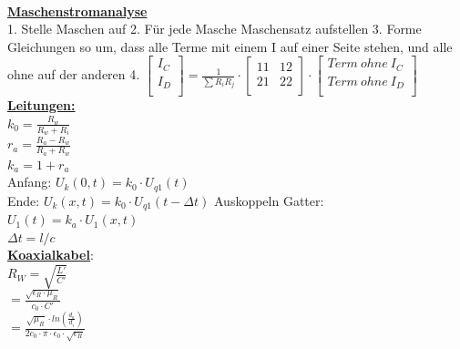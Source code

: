 \documentclass[11pt]{article}
\begin{document}
~~~~~~~
\begin{minipage}{0.3\textwidth}

\underline{\textbf{Maschenstromanalyse}}\\
1. Stelle Maschen auf
2. Für jede Masche Maschensatz aufstellen
3. Forme Gleichungen so um, dass alle Terme mit einem I auf einer Seite stehen, und alle ohne auf der anderen
4. $\begin{bmatrix}
	I_C\\
	I_D\\
\end{bmatrix} = \frac{1}{\sum R_iR_j} \cdot \begin{bmatrix}
	11 & 12\\ %
	21 & 22\\
\end{bmatrix} \cdot \begin{bmatrix}
	Term~ohne~I_C\\
	Term~ohne~I_D\\
\end{bmatrix} 
 $\\

\underline{\textbf{Leitungen:}}\\
$k_0 = \frac{R_w}{R_w + R_i} $\\
$r_a = \frac{R_a - R_w}{R_a + R_w} $\\
$k_a = 1 + r_a$\\
Anfang: $U_k(0,t)=k_0 \cdot U_{q1}(t)$\\
Ende: $U_k(x,t)= k_0 \cdot U_{q1}(t-\Delta t)$
Auskoppeln Gatter:\\
\phantom{ss} $U_1(t) = k_a \cdot U_1(x,t)$\\
$\Delta t = l/c$\\

\underline{\textbf{Koaxialkabel}}:\\
$R_W = \sqrt{\frac{L'}{C'}}$\\
    \phantom{sssi} $=\frac{\sqrt{\epsilon_R \cdot \mu_R}}{c_0 \cdot C'}$\\
    \phantom{sssi} $=\frac{\sqrt{\mu_R} \cdot ln(\frac{d_a}{d_i})}{2c_0 \cdot \pi \cdot \epsilon_0 \cdot \sqrt{\epsilon_R}}$\\


\end{minipage}%
~~~~~~
\end{document}
